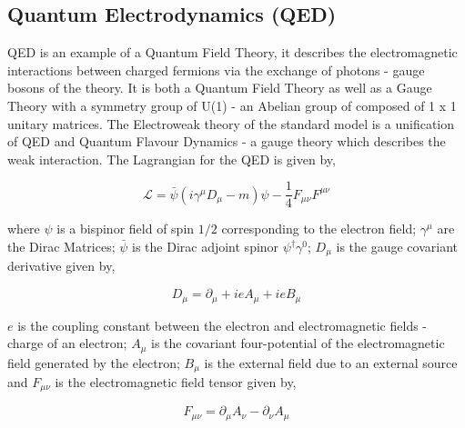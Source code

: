 \subsection{Quantum Electrodynamics (QED)}

QED is an example of a Quantum Field Theory, it describes the electromagnetic interactions between charged fermions via the exchange of photons - gauge bosons of the theory. It is both a Quantum Field Theory as well as a Gauge Theory with a symmetry group of U(1) - an Abelian group of composed of 1 x 1 unitary matrices. The Electroweak theory of the standard model is a unification of QED and Quantum Flavour Dynamics - a gauge theory which describes the weak interaction. The Lagrangian for the QED is given by,

\begin{equation}
	\mathcal{L} = \bar{\psi} (i\gamma^\mu D_\mu - m)\psi - \frac{1}{4}F_{\mu\nu}F^{\mu\nu}
\end{equation}

where $\psi$ is a bispinor field of spin $1/2$ corresponding to the electron field; $\gamma^\mu$ are the Dirac Matrices; $\bar{\psi}$ is the Dirac adjoint spinor $\psi^\dagger \gamma^0$; $D_\mu$ is the gauge covariant derivative given by,

\begin{equation}
	D_\mu = \partial_\mu + ieA_\mu + ieB_\mu
\end{equation}

$e$ is the coupling constant between the electron and electromagnetic fields - charge of an electron; $A_\mu$ is the covariant four-potential of the electromagnetic field generated by the electron; $B_\mu$ is the external field due to an external source and $F_{\mu\nu}$ is the electromagnetic field tensor given by,

\begin{equation}
	F_{\mu\nu} = \partial_\mu A_\nu - \partial_\nu A_\mu
\end{equation}
